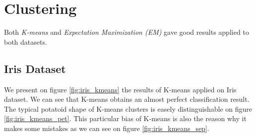 \documentclass[twocolumn, 10pt]{article}
\begin{document}
	\section{Clustering}
		Both \textit{K-means} and \textit{Expectation Maximization (EM)} gave good results applied to both datasets.
		\subsection{Iris Dataset}
			We present on figure \ref{fig:iris_kmeans} the results of K-means applied on Iris dataset. We can see that K-means obtains an almost perfect classification result. The typical potatoid shape of K-means clusters is easely distinguishable on figure \ref{fig:iris_kmeans_pet}. This particular bias of K-means is also the reason why it makes some mistakes as we can see on figure \ref{fig:iris_kmeans_sep}.
\end{document}
